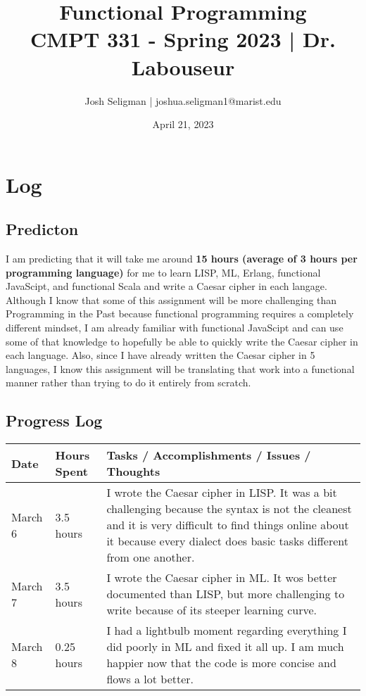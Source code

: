 \documentclass[letterpaper, 10pt, DIV=13]{scrartcl}
\title {
	\normalfont
	\huge{Functional Programming} \\
	\vspace{10pt}
	\large{CMPT 331 - Spring 2023 | Dr. Labouseur}
}
\author{\normalfont Josh Seligman | joshua.seligman1@marist.edu}
\date{\normalfont April 21, 2023}
\numberwithin{equation}{section}
\numberwithin{figure}{section}
\numberwithin{table}{section}
\begin{document}
\maketitle

\section{Log}
\subsection{Predicton}
I am predicting that it will take me around \textbf{15 hours (average of 3 hours per programming language)} for me to learn LISP, ML, Erlang, 
functional JavaScipt, and functional Scala and write a Caesar cipher in each langage. Although I know that some of this assignment will be more 
challenging than Programming in the Past because functional programming requires a completely different mindset, I am already familiar with 
functional JavaScipt and can use some of that knowledge to hopefully be able to quickly write the Caesar cipher in each language. Also, since I 
have already written the Caesar cipher in 5 languages, I know this assignment will be translating that work into a functional manner rather than 
trying to do it entirely from scratch. 

\subsection{Progress Log}
\begin{center}
	\begin{longtable}{|p{1in}|p{1in}|p{4in}|}
		\hline
		Date & Hours Spent & Tasks / Accomplishments / Issues / Thoughts
		\\
		\hline
        March 6 & 3.5 hours & I wrote the Caesar cipher in LISP. It was a bit challenging because the syntax is not the cleanest and it is very 
        difficult to find things online about it because every dialect does basic tasks different from one another.
        \\
		\hline
        March 7 & 3.5 hours & I wrote the Caesar cipher in ML. It wos better documented than LISP, but more challenging to write because of its 
        steeper learning curve.
        \\
        \hline
        March 8 & 0.25 hours & I had a lightbulb moment regarding everything I did poorly in ML and fixed it all up. I am much happier now that the code is
        more concise and flows a lot better.
        \\
        \hline
	\end{longtable}
\end{center}
\end{document}
